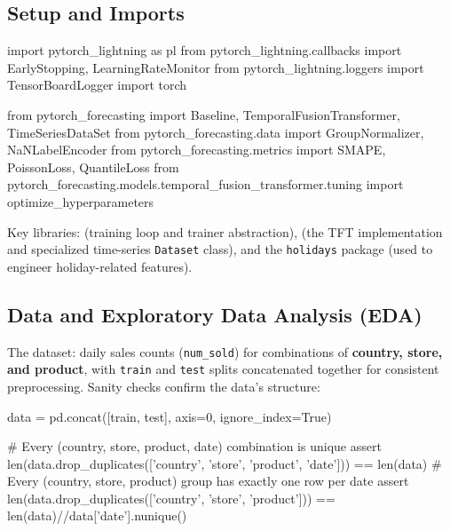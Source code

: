 \documentclass[12pt,openany]{book}
\theoremstyle{definition}
\theoremstyle{remark}
\begin{document}
\subsection{Setup and Imports}

\begin{python}
import pytorch_lightning as pl
from pytorch_lightning.callbacks import EarlyStopping, LearningRateMonitor
from pytorch_lightning.loggers import TensorBoardLogger
import torch

from pytorch_forecasting import Baseline, TemporalFusionTransformer, TimeSeriesDataSet
from pytorch_forecasting.data import GroupNormalizer, NaNLabelEncoder
from pytorch_forecasting.metrics import SMAPE, PoissonLoss, QuantileLoss
from pytorch_forecasting.models.temporal_fusion_transformer.tuning import optimize_hyperparameters
\end{python}

Key libraries:  (training loop and trainer abstraction),
 (the TFT implementation and specialized time-series
\texttt{Dataset} class), and the \texttt{holidays} package (used to engineer
holiday-related features).

\subsection{Data and Exploratory Data Analysis (EDA)}

The dataset: daily sales counts (\texttt{num\_sold}) for combinations of \textbf{country, store, and product}, with \texttt{train} and \texttt{test} splits concatenated together for consistent preprocessing. Sanity checks confirm the data's structure:

\begin{python}
data = pd.concat([train, test], axis=0, ignore_index=True)

# Every (country, store, product, date) combination is unique
assert len(data.drop_duplicates(['country', 'store', 'product', 'date'])) == len(data)
# Every (country, store, product) group has exactly one row per date
assert len(data.drop_duplicates(['country', 'store', 'product'])) == len(data)//data['date'].nunique()
\end{python}
\end{document}
